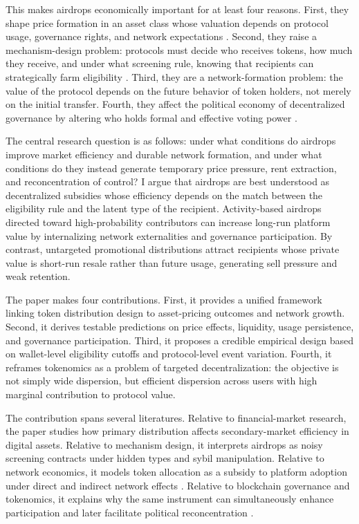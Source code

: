\documentclass[11pt]{article}
\theoremstyle{remark}
\begin{document}
This makes airdrops economically important for at least four reasons. First, they shape price formation in an asset class whose valuation depends on protocol usage, governance rights, and network expectations \citep{liu2021risks, makarov2020trading}. Second, they raise a mechanism-design problem: protocols must decide who receives tokens, how much they receive, and under what screening rule, knowing that recipients can strategically farm eligibility \citep{messias2025airdrops}. Third, they are a network-formation problem: the value of the protocol depends on the future behavior of token holders, not merely on the initial transfer. Fourth, they affect the political economy of decentralized governance by altering who holds formal and effective voting power \citep{yermack2017corporate, abadi2024token}.

The central research question is as follows: under what conditions do airdrops improve market efficiency and durable network formation, and under what conditions do they instead generate temporary price pressure, rent extraction, and reconcentration of control? I argue that airdrops are best understood as decentralized subsidies whose efficiency depends on the match between the eligibility rule and the latent type of the recipient. Activity-based airdrops directed toward high-probability contributors can increase long-run platform value by internalizing network externalities and governance participation. By contrast, untargeted promotional distributions attract recipients whose private value is short-run resale rather than future usage, generating sell pressure and weak retention.

The paper makes four contributions. First, it provides a unified framework linking token distribution design to asset-pricing outcomes and network growth. Second, it derives testable predictions on price effects, liquidity, usage persistence, and governance participation. Third, it proposes a credible empirical design based on wallet-level eligibility cutoffs and protocol-level event variation. Fourth, it reframes tokenomics as a problem of targeted decentralization: the objective is not simply wide dispersion, but efficient dispersion across users with high marginal contribution to protocol value.

The contribution spans several literatures. Relative to financial-market research, the paper studies how primary distribution affects secondary-market efficiency in digital assets. Relative to mechanism design, it interprets airdrops as noisy screening contracts under hidden types and sybil manipulation. Relative to network economics, it models token allocation as a subsidy to platform adoption under direct and indirect network effects \citep{katz1985network, katz1986technology, rochet2003platform}. Relative to blockchain governance and tokenomics, it explains why the same instrument can simultaneously enhance participation and later facilitate political reconcentration \citep{cong2021tokenomics, cong2022tokenbased, abadi2024token}.
\end{document}
